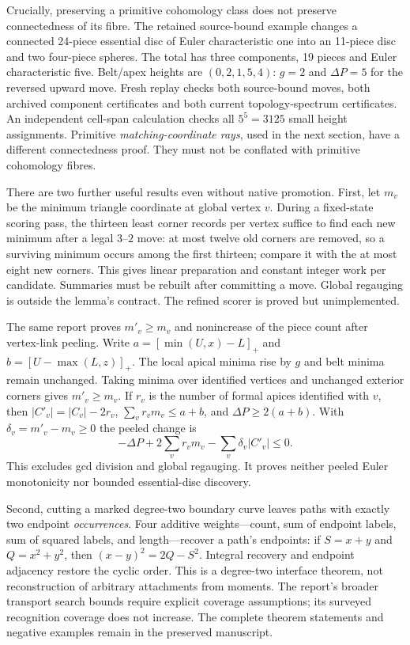 Crucially, preserving a primitive cohomology class does not preserve
connectedness of its fibre. The retained source-bound example changes a
connected 24-piece essential disc of Euler characteristic one into an
11-piece disc and two four-piece spheres. The total has three components,
19 pieces and Euler characteristic five. Belt/apex heights are
$(0,2,1,5,4)$: $g=2$ and $\Delta P=5$ for the reversed upward move.
Fresh replay checks both source-bound moves, both archived component
certificates and both current topology-spectrum certificates. An independent
cell-span calculation checks all $5^5=3125$ small height assignments.
Primitive \emph{matching-coordinate rays}, used in the next section, have
a different connectedness proof. They must not be conflated with primitive
cohomology fibres.

There are two further useful results even without native promotion.
First, let $m_v$ be the minimum triangle coordinate at global vertex $v$.
During a fixed-state scoring pass, the thirteen least corner records per
vertex suffice to find each new minimum after a legal $3$--$2$ move:
at most twelve old corners are removed, so a surviving minimum occurs among
the first thirteen; compare it with the at most eight new corners. This
gives linear preparation and constant integer work per candidate. Summaries
must be rebuilt after committing a move. Global regauging is outside the
lemma's contract. The refined scorer is proved but unimplemented.

The same report proves $m'_v\ge m_v$ and nonincrease of the piece count
after vertex-link peeling. Write
$a=[\min(U,x)-L]_+$ and $b=[U-\max(L,z)]_+$.
The local apical minima rise by $g$ and belt minima remain unchanged.
Taking minima over identified vertices and unchanged exterior corners gives
$m'_v\ge m_v$. If $r_v$ is the number of formal apices identified with $v$,
then $|C'_v|=|C_v|-2r_v$, $\sum_v r_vm_v\le a+b$, and
$\Delta P\ge2(a+b)$. With $\delta_v=m'_v-m_v\ge0$ the peeled change is
\[
 -\Delta P+2\sum_v r_vm_v-\sum_v\delta_v|C'_v|\le0.
\]
This excludes gcd division and global regauging. It proves neither peeled
Euler monotonicity nor bounded essential-disc discovery.

Second, cutting a marked degree-two boundary curve leaves paths with exactly
two endpoint \emph{occurrences}. Four additive weights---count, sum of
endpoint labels, sum of squared labels, and length---recover a path's
endpoints: if $S=x+y$ and $Q=x^2+y^2$, then
$(x-y)^2=2Q-S^2$. Integral recovery and endpoint adjacency restore the cyclic
order. This is a degree-two interface theorem, not reconstruction of
arbitrary attachments from moments. The report's broader transport search
bounds require explicit coverage assumptions; its surveyed recognition
coverage does not increase. The complete theorem statements and negative
examples remain in the preserved manuscript.

